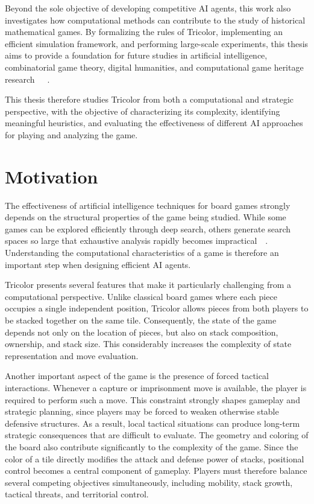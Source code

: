 Beyond the sole objective of developing competitive AI agents, this work also investigates how computational methods can contribute to the study of historical mathematical games. By formalizing the rules of Tricolor, implementing an efficient simulation framework, and performing large-scale experiments, this thesis aims to provide a foundation for future studies in artificial intelligence, combinatorial game theory, digital humanities, and computational game heritage research~\cite{piette2020ludii}~\cite{piette2024gametable_kickoff}~\cite{browne2022dlpworkshop}.

This thesis therefore studies Tricolor from both a computational and strategic perspective, with the objective of characterizing its complexity, identifying meaningful heuristics, and evaluating the effectiveness of different AI approaches for playing and analyzing the game.

\section{Motivation}

The effectiveness of artificial intelligence techniques for board games strongly depends on the structural properties of the game being studied. While some games can be explored efficiently through deep search, others generate search spaces so large that exhaustive analysis rapidly becomes impractical~\cite{russell2010aima}~\cite{browne2012mcts}. Understanding the computational characteristics of a game is therefore an important step when designing efficient AI agents.

Tricolor presents several features that make it particularly challenging from a computational perspective. Unlike classical board games where each piece occupies a single independent position, Tricolor allows pieces from both players to be stacked together on the same tile. Consequently, the state of the game depends not only on the location of pieces, but also on stack composition, ownership, and stack size. This considerably increases the complexity of state representation and move evaluation.

Another important aspect of the game is the presence of forced tactical interactions. Whenever a capture or imprisonment move is available, the player is required to perform such a move. This constraint strongly shapes gameplay and strategic planning, since players may be forced to weaken otherwise stable defensive structures. As a result, local tactical situations can produce long-term strategic consequences that are difficult to evaluate.
The geometry and coloring of the board also contribute significantly to the complexity of the game. Since the color of a tile directly modifies the attack and defense power of stacks, positional control becomes a central component of gameplay. Players must therefore balance several competing objectives simultaneously, including mobility, stack growth, tactical threats, and territorial control.

